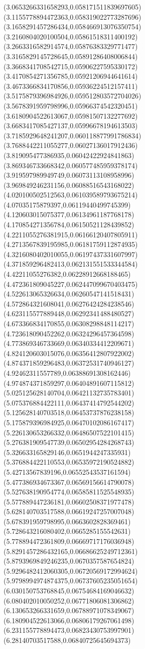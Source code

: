{(3.0653266331658293,0.058171511839697605)
(3.1155778894472363,0.058319022773287696)
(3.1658291457286434,0.058466913076350754)
(3.2160804020100504,0.05861518311400192)
(3.2663316582914574,0.05876383329771477)
(3.3165829145728645,0.05891286408006844)
(3.3668341708542715,0.05906227595330172)
(3.4170854271356785,0.05921206944641614)
(3.4673366834170856,0.05936224512157411)
(3.5175879396984926,0.059512803572704026)
(3.5678391959798996,0.05966374542320451)
(3.6180904522613067,0.05981507132277692)
(3.6683417085427137,0.05996678194613503)
(3.7185929648241207,0.060118877991786834)
(3.7688442211055277,0.06027136017912436)
(3.819095477386935,0.06042422924841863)
(3.869346733668342,0.060577485959378174)
(3.919597989949749,0.06073113108958996)
(3.969849246231156,0.06088516543168022)
(4.020100502512563,0.061039589793675214)
(4.07035175879397,0.06119440499745399)
(4.120603015075377,0.06134961187768178)
(4.170854271356784,0.06150521128439852)
(4.2211055276381915,0.06166120407805911)
(4.2713567839195985,0.06181759112874935)
(4.3216080402010055,0.06197437331607997)
(4.371859296482413,0.062131551533344584)
(4.42211055276382,0.06228912668188465)
(4.472361809045227,0.062447099670403475)
(4.522613065326634,0.06260547141518431)
(4.572864321608041,0.06276424284238546)
(4.623115577889448,0.06292341488480527)
(4.673366834170855,0.06308298848114217)
(4.723618090452262,0.06324296457364598)
(4.773869346733669,0.06340334412209671)
(4.824120603015076,0.06356412807922002)
(4.874371859296483,0.06372531740946127)
(4.92462311557789,0.06388691308162446)
(4.974874371859297,0.06404891607115812)
(5.025125628140704,0.06421132735783401)
(5.075376884422111,0.06437414792544202)
(5.125628140703518,0.06453737876238158)
(5.175879396984925,0.06470102086167417)
(5.226130653266332,0.06486507522101415)
(5.276381909547739,0.06502954284268743)
(5.326633165829146,0.0651944247335931)
(5.376884422110553,0.06535972190524882)
(5.42713567839196,0.06552543537161594)
(5.477386934673367,0.06569156614790078)
(5.527638190954774,0.06585811525548935)
(5.577889447236181,0.06602508371977478)
(5.628140703517588,0.06619247257007048)
(5.678391959798995,0.0663602828369461)
(5.728643216080402,0.0665285155542631)
(5.778894472361809,0.06669717176036948)
(5.8291457286432165,0.06686625249712361)
(5.8793969849246235,0.0670357587654824)
(5.9296482412060305,0.06720569172994624)
(5.9798994974874375,0.06737605235051654)
(6.030150753768845,0.06754684169046632)
(6.080402010050252,0.06771806081306862)
(6.130653266331659,0.06788971078349067)
(6.180904522613066,0.06806179267061498)
(6.231155778894473,0.06823430753997901)
(6.28140703517588,0.06840725645694373)
}
